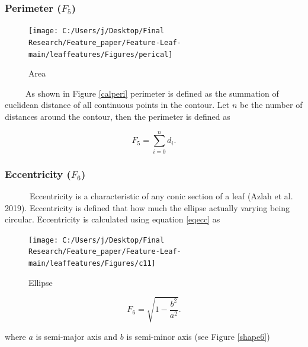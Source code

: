 \documentclass{article}
\begin{document}
\hypertarget{perimeter-f_5}{%
\subsubsection{\texorpdfstring{Perimeter
(\(F_5\))}{Perimeter (F\_5)}}\label{perimeter-f_5}}

\begin{figure}[!ht]

{\centering \texttt{[image: C:/Users/j/Desktop/Final Research/Feature\_paper/Feature-Leaf-main/leaffeatures/Figures/perical]} 

}

\caption{\label{calperi}Area}\label{fig:unnamed-chunk-17}
\end{figure}

~~~~~As shown in Figure \ref{calperi} perimeter is defined as the
summation of euclidean distance of all continuous points in the contour.
Let \(n\) be the number of distances around the contour, then the
perimeter is defined as

\begin{equation}
   F_5 =  \sum_{i=0}^{n}d_i.
\label{equa_F5}
\end{equation}

\hypertarget{eccentricity-f_6}{%
\subsubsection{\texorpdfstring{Eccentricity
(\(F_6\))}{Eccentricity (F\_6)}}\label{eccentricity-f_6}}

~~~~~~Eccentricity is a characteristic of any conic section of a leaf
(Azlah et al. 2019). Eccentricity is defined that how much the ellipse
actually varying being circular. Eccentricity is calculated using
equation \ref{eqecc} as

\begin{figure}[!ht]

{\centering \texttt{[image: C:/Users/j/Desktop/Final Research/Feature\_paper/Feature-Leaf-main/leaffeatures/Figures/c11]} 

}

\caption{\label{shape6}Ellipse}\label{fig:unnamed-chunk-18}
\end{figure}

\begin{equation}
    F_6 = \sqrt{1-\frac{b^2}{a^2}}.
    \label{eqecc}
\end{equation}

where \(a\) is semi-major axis and \(b\) is semi-minor axis (see Figure
\ref{shape6})
\end{document}
